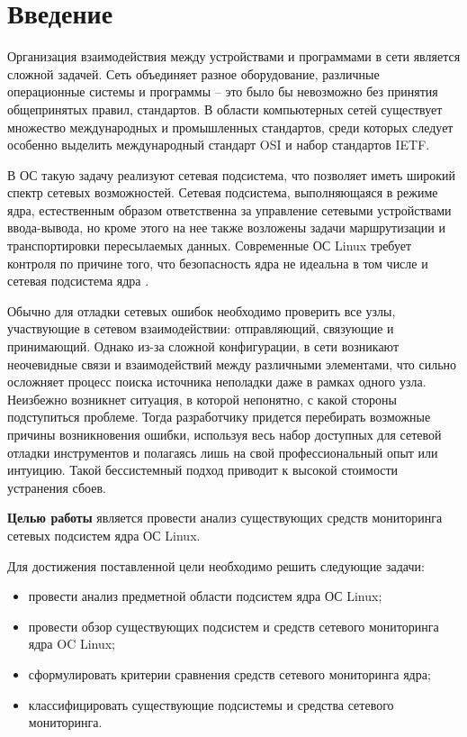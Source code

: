 \chapter*{Введение}

Организация взаимодействия между устройствами и программами в сети является сложной задачей.
Сеть объединяет разное оборудование, различные операционные системы и программы – это было бы невозможно без принятия общепринятых правил, стандартов.
В области компьютерных сетей существует множество международных и промышленных стандартов, среди которых следует особенно выделить международный стандарт OSI и набор стандартов IETF.

В ОС такую задачу реализуют сетевая подсистема, что позволяет иметь широкий спектр сетевых возможностей. Сетевая подсистема, выполняющаяся в режиме ядра, естественным образом ответственна за управление сетевыми устройствами ввода-вывода, но кроме этого на нее также возложены задачи маршрутизации и транспортировки пересылаемых данных.
Современные ОС Linux требует контроля по причине того, что безопасность ядра не идеальна в том числе и сетевая подсистема ядра \cite{moduls_kernel_bugs, version_kernel_bugs}. 
 
Обычно для отладки сетевых ошибок необходимо проверить все узлы, участвующие в сетевом взаимодействии: отправляющий, связующие и принимающий. Однако из-за сложной конфигурации, в сети возникают неочевидные связи и взаимодействий между различными элементами, что сильно осложняет процесс поиска источника неполадки даже в рамках одного узла. Неизбежно возникнет ситуация, в которой непонятно, с какой стороны подступиться проблеме. Тогда разработчику придется перебирать возможные причины возникновения ошибки, используя весь набор доступных для сетевой отладки инструментов и полагаясь лишь на свой профессиональный опыт или интуицию. Такой бессистемный подход приводит к высокой стоимости устранения сбоев.

\textbf{Целью работы} является провести анализ существующих средств мониторинга сетевых подсистем ядра ОС Linux.

Для достижения поставленной цели необходимо решить следующие задачи:
\begin{itemize}[label=---]
	\item провести анализ предметной области подсистем ядра ОС Linux;
	\item провести обзор существующих подсистем и средств сетевого мониторинга ядра OC Linux;
	\item сформулировать критерии сравнения средств сетевого мониторинга ядра;
	\item классифицировать существующие подсистемы и средства сетевого мониторинга.
\end{itemize}